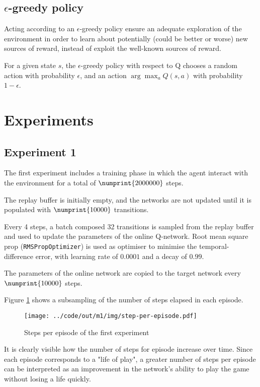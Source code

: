 \documentclass[a4paper,12pt]{article} %
\begin{document}
	\subsection*{$\epsilon$-greedy policy}
	
	Acting according to an $\epsilon$-greedy policy ensure an adequate exploration of the environment in order to learn about potentially (could be better or worse) new sources of reward, instead of exploit the well-known sources of reward.
	
	For a given state $s$, the $\epsilon$-greedy policy with respect to Q chooses a random action with probability $\epsilon$, and an action $\arg \max_a Q(s, a)$ with probability $1 - \epsilon$.
	
	\section{Experiments}
	\subsection*{Experiment 1}
	The first experiment includes a training phase in which the agent interact with the environment for a total of $\numprint{2000000}$ steps.
	
	The replay buffer is initially empty, and the networks are not updated until it is populated with $\numprint{10000}$ transitions. 
	
	Every 4 steps, a batch composed 32 transitions is sampled from the replay buffer and used to update the parameters of the online Q-network.
	Root mean square prop (\texttt{RMSPropOptimizer}) is used as optimiser to minimise the temporal-difference error, with learning rate of ${0.0001}$ and a decay of $0.99$. 
	
	The parameters of the online network are copied to the target network every $\numprint{10000}$ steps.
	\bigskip

	Figure \ref{fig:step-m1} shows a subsampling of the number of steps elapsed in each episode.
	
	\begin{figure}[htb]
		\centering
		\texttt{[image: ../code/out/m1/img/step-per-episode.pdf]}	
		\caption{Steps per episode of the first experiment}
		\label{fig:step-m1}
	\end{figure}

	It is clearly visible how the number of steps for episode increase over time. Since each episode corresponds to a "life of play", a greater number of steps per episode can be interpreted as an improvement in the network's ability to play the game without losing a life quickly. 
	\bigskip
	
\end{document}
